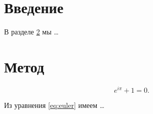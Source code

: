 \documentclass{article}
\begin{document}
\section{Введение}\label{sec:intro}
В разделе \ref{sec:method} мы \dots

\section{Метод}\label{sec:method}
\begin{equation}\label{eq:euler}
e^{i\pi} + 1 = 0.
\end{equation}

Из уравнения \eqref{eq:euler} имеем
\dots
\end{document}

